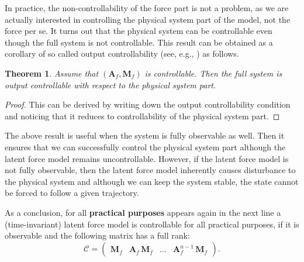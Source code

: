\documentclass[journal]{IEEEtran}
\newtheorem{theorem}{Theorem}[section]
\newcommand{\mauricio}[1]{{\color{blue}#1}}
\begin{document}
In practice, the non-controllability of the force part is not a problem, as we are actually interested in controlling the physical system part of the model, not the force per se. It turns out that the physical system can be controllable even though the full system is not controllable. This result can be obtained as a corollary of so called output controllability (see, e.g., \cite{Ogata:1997}) as follows.

\begin{theorem} \label{the:stab}
Assume that $(\mathbf{A}_f,\mathbf{M}_f)$ is controllable. Then the full system is output controllable with respect to the physical system part.
\end{theorem}

\begin{proof}
This can be derived by writing down the output controllability condition \cite{Ogata:1997} and noticing that it reduces to controllability of the physical system part.
\end{proof}

The above result is useful when the system is fully observable as well. Then it ensures that we can successfully control
the physical system part although the latent force model remains uncontrollable. However, if the latent force model is
not fully observable, then the latent force model inherently causes disturbance to the physical system and although we can keep the system stable, the state cannot be forced to follow a given trajectory.

As a conclusion, for all \mauricio{\textbf{practical purposes} appears again in the next line} a (time-invariant) latent force model is controllable for all practical purposes, if it is observable and the following matrix has a full rank:
%
\begin{equation}
  \mathcal{C} = \begin{pmatrix}
  	\mathbf{M}_f & \mathbf{A}_f \, \mathbf{M}_f & \hdots & \mathbf{A}_f^{n-1} \, \mathbf{M}_f
  \end{pmatrix}.
\end{equation}
\end{document}
